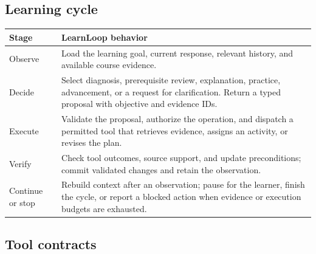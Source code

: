 \documentclass{article}
\begin{document}
\subsection{Learning cycle}

{\small
\begin{longtable}{@{}>{\raggedright\arraybackslash}p{0.8in}>{\raggedright\arraybackslash}p{4.5in}@{}}
\toprule
\textbf{Stage} & \textbf{LearnLoop behavior} \\
\midrule
\endhead
Observe & Load the learning goal, current response, relevant history, and available course evidence. \\
\addlinespace[3pt]
Decide & Select diagnosis, prerequisite review, explanation, practice, advancement, or a request for clarification. Return a typed proposal with objective and evidence IDs. \\
\addlinespace[3pt]
Execute & Validate the proposal, authorize the operation, and dispatch a permitted tool that retrieves evidence, assigns an activity, or revises the plan. \\
\addlinespace[3pt]
Verify & Check tool outcomes, source support, and update preconditions; commit validated changes and retain the observation. \\
\addlinespace[3pt]
Continue or stop & Rebuild context after an observation; pause for the learner, finish the cycle, or report a blocked action when evidence or execution budgets are exhausted. \\
\bottomrule
\end{longtable}
}

\subsection{Tool contracts}
\end{document}
